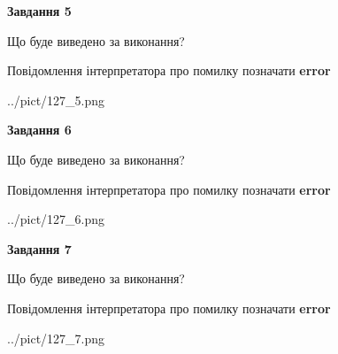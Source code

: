 \documentclass[10pt, ukrainian]{article}
\begin{document}
{\begin {large}
{\begin {center}\textbf{Завдання 5}\end {center}}\par
Що буде виведено за виконання? \par
Повідомлення інтерпретатора про помилку позначати \textbf{error}

\begin{center}
	{../pict/127_5.png}
\end{center}
\newpage

{\begin {center}\textbf{Завдання 6}\end {center}}\par
Що буде виведено за виконання? \par
Повідомлення інтерпретатора про помилку позначати \textbf{error}

\begin{center}
	{../pict/127_6.png}
\end{center}
\newpage

{\begin {center}\textbf{Завдання 7}\end {center}}\par
Що буде виведено за виконання? \par
Повідомлення інтерпретатора про помилку позначати \textbf{error}

\begin{center}
	{../pict/127_7.png}
\end{center}
\newpage

\end {large}}
\end{document}
